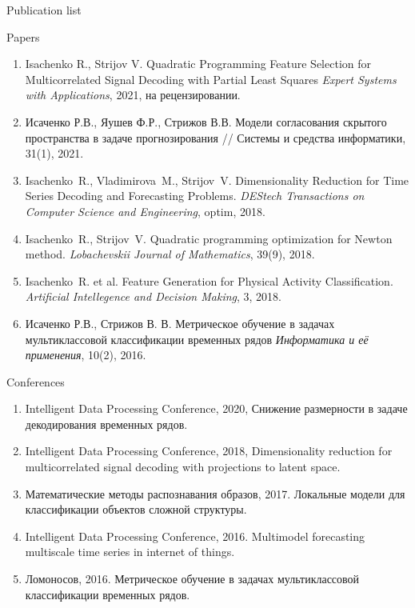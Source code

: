 \documentclass[10pt]{beamer}
\begin{document}
\begin{frame}{Publication list}
	\vspace{-0.1cm}
	\begin{block}{Papers}
		\vspace{-0.1cm}
		{\scriptsize
		\begin{enumerate}
			\item Isachenko R., Strijov V. Quadratic Programming Feature Selection for Multicorrelated Signal Decoding with Partial Least Squares \emph{Expert Systems with Applications}, 2021, на рецензировании.
			\item Исаченко Р.В., Яушев Ф.Р., Стрижов В.В. Модели согласования скрытого пространства в задаче прогнозирования // Системы и средства информатики, 31(1), 2021.
			\item Isachenko~R., Vladimirova~M., Strijov~V. Dimensionality Reduction for Time Series Decoding and Forecasting Problems. \emph{DEStech Transactions on Computer Science and Engineering}, optim, 2018.
			\item Isachenko~R., Strijov~V. Quadratic programming optimization for Newton method. \emph{Lobachevskii Journal of Mathematics}, 39(9), 2018.
			\item Isachenko~R. et al. Feature Generation for Physical Activity Classification. \emph{Artificial Intellegence and Decision Making}, 3, 2018.
			\item Исаченко Р.В., Стрижов В. В. Метрическое обучение в задачах мультиклассовой классификации временных рядов \emph{Информатика и её применения}, 10(2), 2016.
		\end{enumerate}
	}
	\end{block}
\vspace{-0.3cm}
\begin{block}{Conferences}
	\vspace{-0.1cm}
	{\scriptsize
	\begin{enumerate}
		\item  Intelligent Data Processing Conference, 2020, Снижение размерности в задаче декодирования временных рядов.
		\item  Intelligent Data Processing Conference, 2018, Dimensionality reduction for multicorrelated signal decoding with projections to latent space. 
		\item Математические методы распознавания образов, 2017. Локальные модели для классификации объектов сложной структуры.
		\item Intelligent Data Processing Conference, 2016. Multimodel forecasting multiscale time series in internet of things.
		\item Ломоносов, 2016. Метрическое обучение в задачах мультиклассовой классификации временных рядов.
	\end{enumerate}
	}
\end{block}
\end{frame}
\end{document}

